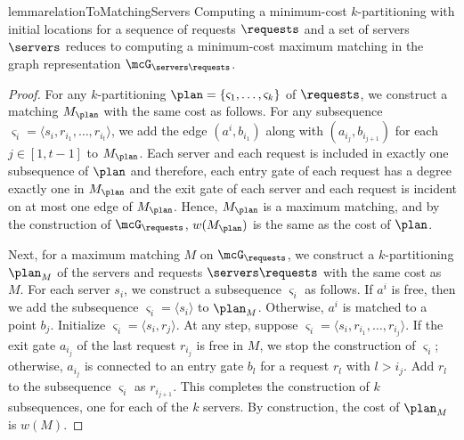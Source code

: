 \begin{restatable}{lemma}{relationToMatchingServers}\label{lemma:relationToMatchingServers}
    Computing a minimum-cost $k$-partitioning with initial locations for a sequence of requests $\requests$ and a set of servers $\servers$ reduces to computing a minimum-cost maximum matching in the graph representation $\mcG_{\servers\requests}$.
\end{restatable}
\begin{proof}
For any $k$-partitioning $\plan=\{\varsigma_1,\ldots, \varsigma_k\}$ of $\requests$, we construct a matching $M_\plan$ with the same cost as follows. For any subsequence $\varsigma_i=\langle s_i, r_{i_1}, \ldots, r_{i_t}\rangle$, we add the edge $(a^i, b_{i_1})$ along with $(a_{i_j}, b_{i_{j+1}})$ for each $j\in[1, t-1]$ to $M_\plan$. Each server and each request is included in exactly one subsequence of $\plan$ and therefore, each entry gate of each request has a degree exactly one in $M_\plan$ and the exit gate of each server and each request is incident on at most one edge of $M_\plan$. Hence, $M_\plan$ is a maximum matching, and by the construction of $\mcG_\requests$, $w(M_\plan)$ is the same as the cost of $\plan$.

Next, for a maximum matching $M$ on $\mcG_\requests$, we construct a $k$-partitioning $\plan_M$ of the servers and requests $\servers\requests$ with the same cost as $M$. For each server $s_i$, we construct a subsequence $\varsigma_i$ as follows. If $a^i$ is free, then we add the subsequence $\varsigma_i=\langle s_i\rangle$ to $\plan_M$. Otherwise, $a^i$ is matched to a point $b_j$. Initialize $\varsigma_i=\langle s_i, r_j\rangle$. At any step, suppose $\varsigma_i=\langle s_i, r_{i_1}, \ldots, r_{i_j}\rangle$. If the exit gate $a_{i_j}$ of the last request $r_{i_j}$ is free in $M$, we stop the construction of $\varsigma_i$; otherwise, $a_{i_j}$ is connected to an entry gate $b_{l}$ for a request $r_{l}$ with $l>i_j$. Add $r_l$ to the subsequence $\varsigma_i$ as $r_{i_{j+1}}$. This completes the construction of $k$ subsequences, one for each of the $k$ servers. By construction, the cost of $\plan_M$ is $w(M)$.
\end{proof}






